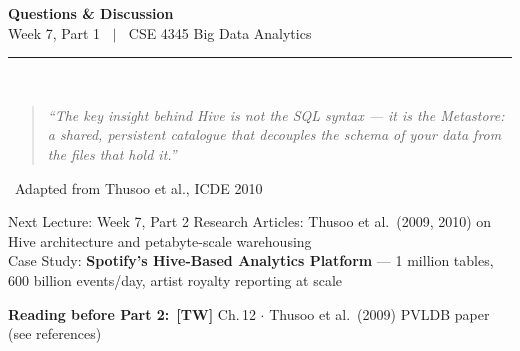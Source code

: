 \documentclass[aspectratio=169,10pt]{beamer}
\begin{document}
\begin{frame}[c]
  \begin{center}
    {\Large\bfseries Questions \& Discussion}\\[10pt]
    {\large Week 7, Part 1 $\;\mid\;$ CSE 4345 Big Data Analytics}\\[8pt]
    \textcolor{PUGray}{\rule{7cm}{0.5pt}}\\[10pt]
    \begin{quote}
      \itshape ``The key insight behind Hive is not the SQL syntax --- it is the Metastore: a shared, persistent catalogue that decouples the \textit{schema} of your data from the \textit{files} that hold it.''
    \end{quote}
    \hfill\textemdash\ Adapted from Thusoo et al., ICDE 2010
    \vspace{12pt}
    \begin{block}{\centering Next Lecture: Week 7, Part 2}
      \centering
      Research Articles: Thusoo et al.\ (2009, 2010) on Hive architecture and petabyte-scale warehousing\\[4pt]
      Case Study: \textbf{Spotify's Hive-Based Analytics Platform} ---
      1 million tables, 600 billion events/day, artist royalty reporting at scale
    \end{block}
    \vspace{6pt}
    \textbf{Reading before Part 2:}\ \textbf{[TW]} Ch.\,12 $\cdot$ Thusoo et al.\ (2009) PVLDB paper (see references)
  \end{center}
\end{frame}

\end{document}
